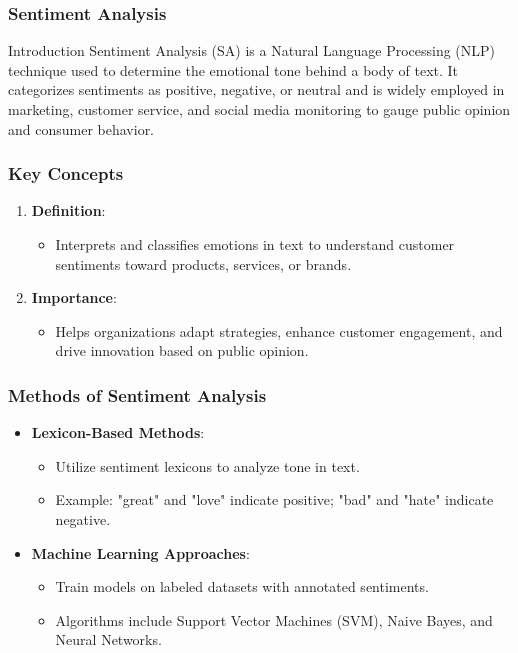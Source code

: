 \documentclass[aspectratio=169]{beamer}
\begin{document}
\begin{frame}
    \frametitle{Sentiment Analysis}
    \begin{block}{Introduction}
        Sentiment Analysis (SA) is a Natural Language Processing (NLP) technique used to determine the emotional tone behind a body of text. 
        It categorizes sentiments as positive, negative, or neutral and is widely employed in marketing, customer service, and social media monitoring to gauge public opinion and consumer behavior.
    \end{block}
\end{frame}

\begin{frame}
    \frametitle{Key Concepts}
    \begin{enumerate}
        \item \textbf{Definition}: 
        \begin{itemize}
            \item Interprets and classifies emotions in text to understand customer sentiments toward products, services, or brands.
        \end{itemize}
        \item \textbf{Importance}:
        \begin{itemize}
            \item Helps organizations adapt strategies, enhance customer engagement, and drive innovation based on public opinion.
        \end{itemize}
    \end{enumerate}
\end{frame}

\begin{frame}[fragile]
    \frametitle{Methods of Sentiment Analysis}
    \begin{itemize}
        \item \textbf{Lexicon-Based Methods}:
        \begin{itemize}
            \item Utilize sentiment lexicons to analyze tone in text.
            \item Example: "great" and "love" indicate positive; "bad" and "hate" indicate negative.
        \end{itemize}
        \item \textbf{Machine Learning Approaches}:
        \begin{itemize}
            \item Train models on labeled datasets with annotated sentiments.
            \item Algorithms include Support Vector Machines (SVM), Naive Bayes, and Neural Networks.
        \end{itemize}
    \end{itemize}
\end{frame}
\end{document}
